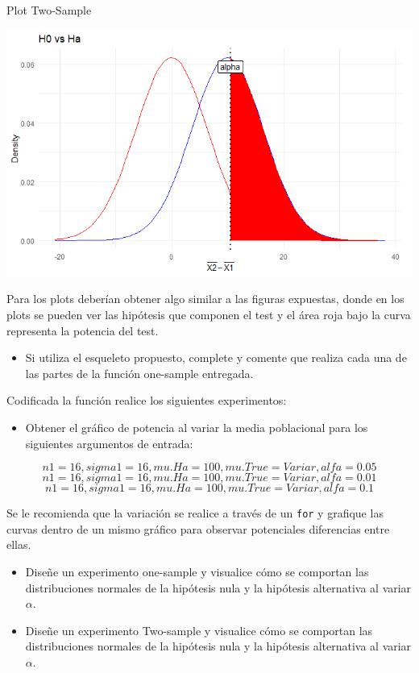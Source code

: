 \documentclass[]{article}
\providecommand{\tightlist}{%
  \setlength{\itemsep}{0pt}\setlength{\parskip}{0pt}}
\begin{document}
Plot Two-Sample

\includegraphics{plot_potencia_2.png}

Para los plots deberían obtener algo similar a las figuras expuestas,
donde en los plots se pueden ver las hipótesis que componen el test y el
área roja bajo la curva representa la potencia del test.

\begin{itemize}
\tightlist
\item
  Si utiliza el esqueleto propuesto, complete y comente que realiza cada
  una de las partes de la función one-sample entregada.
\end{itemize}

Codificada la función realice los siguientes experimentos:

\begin{itemize}
\tightlist
\item
  Obtener el gráfico de potencia al variar la media poblacional para los
  siguientes argumentos de entrada:
\end{itemize}

\[ n1=16, sigma1=16, mu.Ha=100 , mu.True=Variar, alfa=0.05 \]
\[ n1=16, sigma1=16, mu.Ha=100 , mu.True= Variar, alfa=0.01 \]
\[ n1=16, sigma1=16, mu.Ha=100 , mu.True= Variar, alfa=0.1 \]

Se le recomienda que la variación se realice a través de un \texttt{for}
y grafique las curvas dentro de un mismo gráfico para observar
potenciales diferencias entre ellas.

\begin{itemize}
\item
  Diseñe un experimento one-sample y visualice cómo se comportan las
  distribuciones normales de la hipótesis nula y la hipótesis
  alternativa al variar \(\alpha\).
\item
  Diseñe un experimento Two-sample y visualice cómo se comportan las
  distribuciones normales de la hipótesis nula y la hipótesis
  alternativa al variar \(\alpha\).
\end{itemize}
\end{document}
